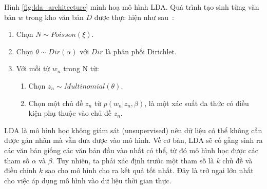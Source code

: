 
Hình \ref{fig:lda_architecture} minh hoạ mô hình LDA. Quá trình tạo sinh từng văn bản $w$ trong kho văn bản $D$ được thực hiện như sau~\cite{bleiLatentDirichletAllocation2003}:

\begin{enumerate}
	\item Chọn $N \sim Poisson(\xi)$.
	\item Chọn $\theta \sim Dir(\alpha)$ với $Dir$ là phân phối Dirichlet.
	\item Với mỗi từ $w_n$ trong N từ:
	\begin{enumerate}
		\item Chọn $z_n \sim Multinomial(\theta)$.
		\item Chọn một chủ đề $z_n$ từ $p(w_n|z_n,\beta)$, là một xác suất đa thức có điều kiện phụ thuộc vào chủ đề $z_n$.
	\end{enumerate}
\end{enumerate}

LDA là mô hình học không giám sát (unsupervised) nên dữ liệu có thể không cần được gán nhãn mà vẫn đưa được vào mô hình. Về cơ bản, LDA sẽ cố gắng sinh ra các văn bản giống các văn bản đầu vào nhất có thể, từ đó mô hình học được các tham số $\alpha$ và $\beta$. Tuy nhiên, ta phải xác định trước một tham số là $k$ chủ đề và điều chỉnh $k$ sao cho mô hình cho ra kết quả tốt nhất. Đây là trở ngại lớn nhất cho việc áp dụng mô hình vào dữ liệu thời gian thực.



